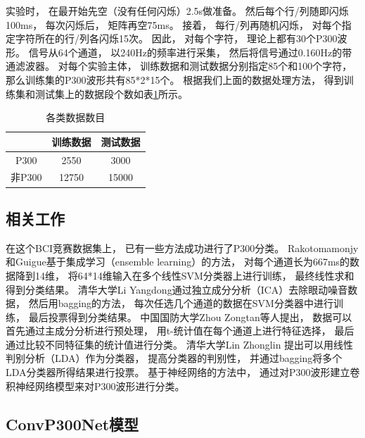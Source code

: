 实验时， 在最开始先空（没有任何闪烁）2.5s做准备。 然后每个行/列随即闪烁100ms， 每次闪烁后， 矩阵再空75ms。 接着， 每行/列再随机闪烁， 对每个指定字符所在的行/列各闪烁15次。 因此， 对每个字符， 理论上都有30个P300波形。 信号从64个通道， 以240Hz的频率进行采集， 然后将信号通过0.160Hz的带通滤波器\cite{sharbrough1991american}。 对每个实验主体， 训练数据和测试数据分别指定85个和100个字符， 那么训练集的P300波形共有85*2*15个。 根据我们上面的数据处理方法， 得到训练集和测试集上的数据段个数如表\ref{tab:p300_experiment_conf}所示。 


\begin{table}[ht]
\centering
  \begin{tabular}{|c||c|c|}
  \hline
   & 训练数据 & 测试数据\\
  \hline\hline
   P300 & 2550 & 3000\\
  \hline
  非P300 & 12750 & 15000\\
  \hline
  \end{tabular}
  \caption{各类数据数目}
  \centering \label{tab:p300_experiment_conf}
\end{table}


\subsection{相关工作}
在这个BCI竞赛数据集上， 已有一些方法成功进行了P300分类。 Rakotomamonjy和Guigue基于集成学习（ensemble learning）的方法， 对每个通道长为667ms的数据降到14维， 将64*14维输入在多个线性SVM分类器上进行训练， 最终线性求和得到分类结果\cite{rakotomamonjy2008bci}。 清华大学Li Yangdong通过独立成分分析（ICA）去除眼动噪音数据， 然后用bagging的方法， 每次任选几个通道的数据在SVM分类器中进行训练， 最后投票得到分类结果\cite{yang2008p300}。 中国国防大学Zhou Zongtan等人提出， 数据可以首先通过主成分分析进行预处理， 用t-统计值在每个通道上进行特征选择， 最后通过比较不同特征集的统计值进行分类。 清华大学Lin Zhonglin 提出可以用线性判别分析（LDA）作为分类器， 提高分类器的判别性， 并通过bagging将多个LDA分类器所得结果进行投票\cite{breiman1996bagging}。 基于神经网络的方法中， 通过对P300波形建立卷积神经网络模型来对P300波形进行分类\cite{felzer2003analyzing,anderson1995determining,cecotti2008time,masic1995neural,masic1993neural}。

	
\subsection{ConvP300Net模型}

